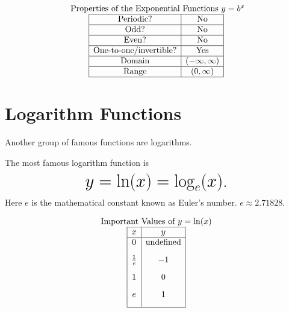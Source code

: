 \documentclass[nooutcomes]{ximera}
\begin{document}
\[
\begin{array}{c}
 \text{ Properties of the Exponential Functions } y=b^x \\
\begin{array}{|c|c|}
\hline
\text{Periodic?} & \text{No} \\ \hline
\text{Odd?} & \text{No} \\ \hline
\text{Even?} & \text{No} \\ \hline
\text{One-to-one/invertible?} & \text{Yes} \\ \hline
\text{Domain} & (-\infty,\infty)\\ \hline
\text{Range} & (0,\infty)\\ \hline
\end{array}
\end{array}
 \]
 
 
 
\newpage
 
 
\section{Logarithm Functions}
Another group of famous functions are logarithms.
 
\begin{example}
The most famous logarithm function is
 $$ \mbox{\huge $y=\ln(x)=\log_{e}(x)$.}$$
Here $e$ is the mathematical constant known as Euler's number. $e \approx 2.71828$.
 
\begin{center}
\end{center}
 
 
\[
\begin{array}{ c  }
  \text{Important Values of $y=\ln(x)$}\\
 \begin{array}{|c|c|}
 \hline
 x & y\\
 \hline
0&\text{undefined}\\[2ex]
\frac{1}{e}&-1\\[2ex]
1&0\\[2ex]
e&1\\[2ex]
 \hline
 \end{array}
\end{array}
 \]
 
\end{example}
 
\end{document}
